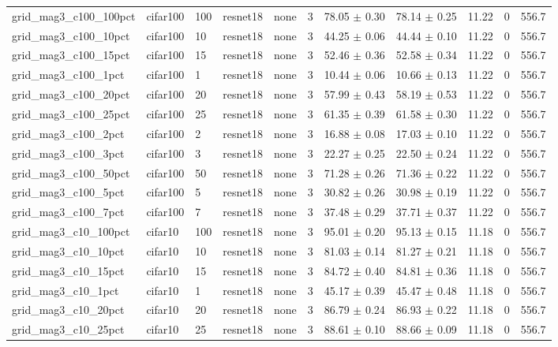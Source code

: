 \begin{tabular}{lllllllllll}
grid_mag3_c100_100pct & cifar100 & 100 & resnet18 & none & 3 & 78.05 $\pm$ 0.30 & 78.14 $\pm$ 0.25 & 11.22 & 0 & 556.7 \\
grid_mag3_c100_10pct & cifar100 & 10 & resnet18 & none & 3 & 44.25 $\pm$ 0.06 & 44.44 $\pm$ 0.10 & 11.22 & 0 & 556.7 \\
grid_mag3_c100_15pct & cifar100 & 15 & resnet18 & none & 3 & 52.46 $\pm$ 0.36 & 52.58 $\pm$ 0.34 & 11.22 & 0 & 556.7 \\
grid_mag3_c100_1pct & cifar100 & 1 & resnet18 & none & 3 & 10.44 $\pm$ 0.06 & 10.66 $\pm$ 0.13 & 11.22 & 0 & 556.7 \\
grid_mag3_c100_20pct & cifar100 & 20 & resnet18 & none & 3 & 57.99 $\pm$ 0.43 & 58.19 $\pm$ 0.53 & 11.22 & 0 & 556.7 \\
grid_mag3_c100_25pct & cifar100 & 25 & resnet18 & none & 3 & 61.35 $\pm$ 0.39 & 61.58 $\pm$ 0.30 & 11.22 & 0 & 556.7 \\
grid_mag3_c100_2pct & cifar100 & 2 & resnet18 & none & 3 & 16.88 $\pm$ 0.08 & 17.03 $\pm$ 0.10 & 11.22 & 0 & 556.7 \\
grid_mag3_c100_3pct & cifar100 & 3 & resnet18 & none & 3 & 22.27 $\pm$ 0.25 & 22.50 $\pm$ 0.24 & 11.22 & 0 & 556.7 \\
grid_mag3_c100_50pct & cifar100 & 50 & resnet18 & none & 3 & 71.28 $\pm$ 0.26 & 71.36 $\pm$ 0.22 & 11.22 & 0 & 556.7 \\
grid_mag3_c100_5pct & cifar100 & 5 & resnet18 & none & 3 & 30.82 $\pm$ 0.26 & 30.98 $\pm$ 0.19 & 11.22 & 0 & 556.7 \\
grid_mag3_c100_7pct & cifar100 & 7 & resnet18 & none & 3 & 37.48 $\pm$ 0.29 & 37.71 $\pm$ 0.37 & 11.22 & 0 & 556.7 \\
grid_mag3_c10_100pct & cifar10 & 100 & resnet18 & none & 3 & 95.01 $\pm$ 0.20 & 95.13 $\pm$ 0.15 & 11.18 & 0 & 556.7 \\
grid_mag3_c10_10pct & cifar10 & 10 & resnet18 & none & 3 & 81.03 $\pm$ 0.14 & 81.27 $\pm$ 0.21 & 11.18 & 0 & 556.7 \\
grid_mag3_c10_15pct & cifar10 & 15 & resnet18 & none & 3 & 84.72 $\pm$ 0.40 & 84.81 $\pm$ 0.36 & 11.18 & 0 & 556.7 \\
grid_mag3_c10_1pct & cifar10 & 1 & resnet18 & none & 3 & 45.17 $\pm$ 0.39 & 45.47 $\pm$ 0.48 & 11.18 & 0 & 556.7 \\
grid_mag3_c10_20pct & cifar10 & 20 & resnet18 & none & 3 & 86.79 $\pm$ 0.24 & 86.93 $\pm$ 0.22 & 11.18 & 0 & 556.7 \\
grid_mag3_c10_25pct & cifar10 & 25 & resnet18 & none & 3 & 88.61 $\pm$ 0.10 & 88.66 $\pm$ 0.09 & 11.18 & 0 & 556.7 \\

\end{tabular}
